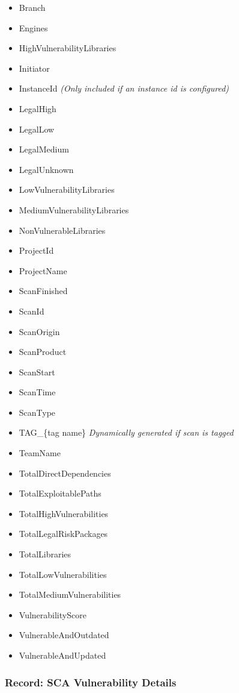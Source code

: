 \begin{itemize}
    \item Branch
    \item Engines
    \item HighVulnerabilityLibraries
    \item Initiator
    \item InstanceId \textit{(Only included if an instance id is configured)}
    \item LegalHigh
    \item LegalLow
    \item LegalMedium
    \item LegalUnknown
    \item LowVulnerabilityLibraries
    \item MediumVulnerabilityLibraries
    \item NonVulnerableLibraries
    \item ProjectId
    \item ProjectName
    \item ScanFinished
    \item ScanId
    \item ScanOrigin
    \item ScanProduct
    \item ScanStart
    \item ScanTime
    \item ScanType
    \item TAG\_\{tag name\} \textit{Dynamically generated if scan is tagged}
    \item TeamName
    \item TotalDirectDependencies
    \item TotalExploitablePaths
    \item TotalHighVulnerabilities
    \item TotalLegalRiskPackages
    \item TotalLibraries
    \item TotalLowVulnerabilities
    \item TotalMediumVulnerabilities
    \item VulnerabilityScore
    \item VulnerableAndOutdated
    \item VulnerableAndUpdated
\end{itemize}


\subsubsection{Record: SCA Vulnerability Details}

